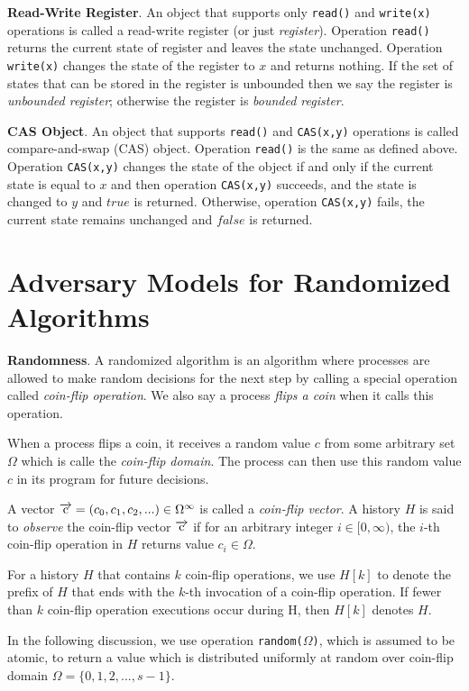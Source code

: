 \textbf{Read-Write Register}.
An object that supports only \texttt{read()} and \texttt{write(x)} operations is called
a read-write register (or just \emph{register}). Operation \texttt{read()} returns the current state of register and
leaves the state unchanged. Operation \texttt{write(x)} changes the state of the register to $x$ and returns nothing.
If the set of states that can be stored in the register is unbounded then we say the register is \emph{unbounded register};
otherwise the register is \emph{bounded register}.

\textbf{CAS Object}. An object that supports \texttt{read()} and \texttt{CAS(x,y)} operations is called compare-and-swap (CAS) object.
Operation \texttt{read()} is the same as defined above. Operation \texttt{CAS(x,y)} changes the state of
the object if and only if the current state is equal to $x$ and then operation \texttt{CAS(x,y)} succeeds, and the state is changed
to $y$ and $true$ is returned. Otherwise, operation \texttt{CAS(x,y)} fails, the current state remains unchanged and
$false$ is returned.

\section{Adversary Models for Randomized Algorithms}

\textbf{Randomness}.
A randomized algorithm is an algorithm where processes are allowed to make random decisions for the next step
by calling a special operation called \emph{coin-flip operation}. We also say a process \emph{flips a coin}
when it calls this operation.

When a process flips a coin, it receives a random value $c$ from some arbitrary set $\Omega$
which is calle the \emph{coin-flip domain}. The process can then use this random value $c$ in its program for future decisions.

A vector $\overrightarrow{\rm c} = (c_0, c_1, c_2,...) \in \Omega^{\infty}$ is called a \emph{coin-flip vector}.
A history $H$ is said to \emph{observe} the coin-flip vector $\overrightarrow{\rm c}$ if
for an arbitrary integer $i \in [0, \infty)$, the $i$-th coin-flip operation in $H$ returns value $c_i \in \Omega$.

For a history $H$ that contains $k$ coin-flip operations, we use $H[k]$ to denote the prefix of $H$
that ends with the $k$-th invocation of a coin-flip operation. If fewer than $k$ coin-flip operation
executions occur during H, then $H[k]$ denotes $H$.

In the following discussion, we use operation \texttt{random($\Omega$)}, which is assumed
to be atomic, to return a value which is distributed uniformly at random over coin-flip domain
$\Omega = \{0, 1, 2,..., s-1\}$.

